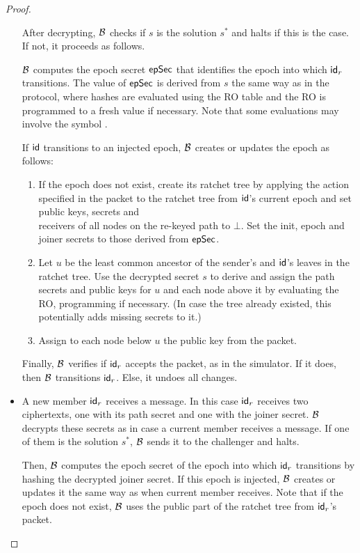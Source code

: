 \begin{proof}
\begin{itemize}
    After decrypting, $\mathcal{B}_{\relax}$ checks if $s$ is the solution $s^*$ and halts if this is the case. If not, it proceeds as follows.

    $\mathcal{B}_{\relax}$ computes the epoch secret ${\mathsf{epSec}}$ that identifies the epoch into which ${\mathsf{id}}_r$ transitions. The value of ${\mathsf{epSec}}$ is derived from $s$ the same way as in the protocol, where hashes are evaluated using the RO table and the RO is programmed to a fresh value if necessary. Note that some evaluations may involve the symbol .

    If ${\mathsf{id}}$ transitions to an injected epoch, $\mathcal{B}_{\relax}$ creates or updates the epoch as follows:
    \begin{enumerate}
      \item If the epoch does not exist, create its ratchet tree by applying the action specified in the packet to the ratchet tree from ${\mathsf{id}}$'s current epoch and set public keys, secrets and \\\mmowrcca receivers of all nodes on the re-keyed path to $\bot$. Set the init, epoch and joiner secrets to those derived from ${\mathsf{epSec}}$.
      \item Let $u$ be the least common ancestor of the sender's and ${\mathsf{id}}$'s leaves in the ratchet tree. Use the decrypted secret $s$ to derive and assign the path secrets and public keys for $u$ and each node above it by evaluating the RO, programming if necessary. (In case the tree already existed, this potentially adds missing secrets to it.)
      \item Assign to each node below $u$ the public key from the packet.
    \end{enumerate}

    Finally, $\mathcal{B}_{\relax}$ verifies if ${\mathsf{id}}_r$ accepts the packet, as in the simulator. If it does, then $\mathcal{B}_{\relax}$ transitions ${\mathsf{id}}_r$. Else, it undoes all changes.
  \item {\sc A new member ${\mathsf{id}}_r$ receives a message.}
    In this case ${\mathsf{id}}_r$ receives two ciphertexts, one with its path secret and one with the joiner secret. $\mathcal{B}_{\relax}$ decrypts these secrets as in case a current member receives a message. If one of them is the solution $s^*$, $\mathcal{B}_{\relax}$ sends it to the challenger and halts.

    Then, $\mathcal{B}_{\relax}$ computes the epoch secret of the epoch into which ${\mathsf{id}}_r$ transitions by hashing the decrypted joiner secret. If this epoch is injected, $\mathcal{B}_{\relax}$ creates or updates it the same way as when current member receives. Note that if the epoch does not exist, $\mathcal{B}_{\relax}$ uses the public part of the ratchet tree from ${\mathsf{id}}_r$'s packet.


\end{itemize}
\end{proof}
